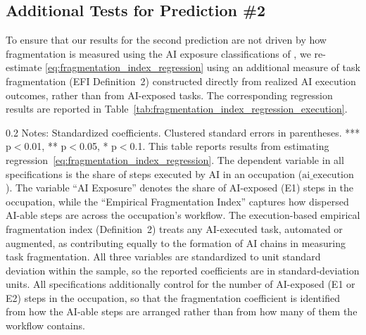 \subsection{Additional Tests for Prediction \#2}
\label{app:additional_robustness_pred2}
To ensure that our results for the second prediction are not driven by how fragmentation is measured using the AI exposure classifications of \citet{eloundou2023gpts}, we re-estimate \eqref{eq:fragmentation_index_regression} using an additional measure of task fragmentation (EFI Definition~2) constructed directly from realized AI execution outcomes, rather than from AI-exposed tasks.
The corresponding regression results are reported in Table~\ref{tab:fragmentation_index_regression_execution}.

\begin{table}[!t]
    \caption{Role of AI-able Task Fragmentation in Determining AI Execution Outcomes (Execution-Based Empirical Fragmentation Measure)}
    \label{tab:fragmentation_index_regression_execution}
    \footnotesize
    \centering
    
    \begin{minipage}{1\linewidth}
\begin{spacing}{0.2}
{\fontsize{9.5pt}{10pt}\selectfont Notes: Standardized coefficients. Clustered standard errors in parentheses. *** p$<$0.01, ** p$<$0.05, * p$<$0.1.
This table reports results from estimating regression~\eqref{eq:fragmentation_index_regression}.
The dependent variable in all specifications is the share of steps executed by AI in an occupation ($\text{ai\_execution}$).
The variable ``AI Exposure'' denotes the share of AI-exposed (E1) steps in the occupation, while the ``Empirical Fragmentation Index'' captures how dispersed AI-able steps are across the occupation's workflow.
The execution-based empirical fragmentation index (Definition~2) treats any AI-executed task, automated or augmented, as contributing equally to the formation of AI chains in measuring task fragmentation.
All three variables are standardized to unit standard deviation within the sample, so the reported coefficients are in standard-deviation units. All specifications additionally control for the number of AI-exposed (E1 or E2) steps in the occupation, so that the fragmentation coefficient is identified from how the AI-able steps are arranged rather than from how many of them the workflow contains.}
\end{spacing}
\end{minipage}\end{table}

